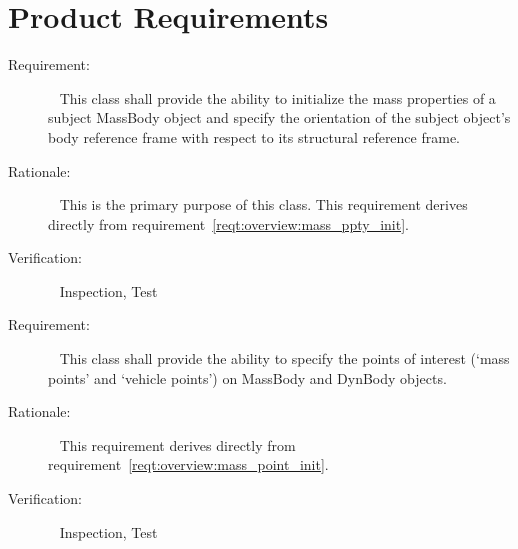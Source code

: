 %

\chapter{Product Requirements}\label{ch:\modelpartid:reqt}


\label{reqt:MassBodyInit:mass_ppty_init}
\begin{description}
  \item[Requirement:]\ \newline
    This class shall provide the ability
    to initialize the mass properties of a subject MassBody object
    and specify the orientation of the subject object's
    body reference frame with respect to its structural reference frame.
  \item[Rationale:]\ \newline
    This is the primary purpose of this class.
    This requirement derives directly from
    requirement~\ref{reqt:overview:mass_ppty_init}.
  \item[Verification:]\ \newline
    Inspection, Test
\end{description}

\label{reqt:MassBodyInit:mass_pnts_init}
\begin{description}
  \item[Requirement:]\ \newline
    This class shall provide the ability to specify the
    points of interest (`mass points' and `vehicle points')
    on MassBody and DynBody objects.
  \item[Rationale:]\ \newline
    This requirement derives directly from
    requirement~\ref{reqt:overview:mass_point_init}.
  \item[Verification:]\ \newline
    Inspection, Test
\end{description}

